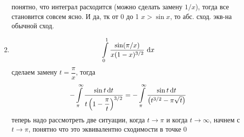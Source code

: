 \documentclass{report}
\begin{document}
\begin{enumerate}
\[    \]
    понятно, что интеграл расходится (можно сделать замену $1/x$), тогда все становится совсем ясно. И да, тк от 0 до 1 $x > \sin x$, то абс. сход. экв-на обычной сход.\\
\item 
    \[
    \int\limits_0^1 \dfrac{\sin(\pi/x)}{x(1-x)^{3/2}}\,\dl x
    \]
    сделаем замену $t = \dfrac{\pi}{x}$, тогда
    \[
        -\int\limits_{\pi}^{\infty} \dfrac{\sin t\dl t}{t\left(1-\dfrac{\pi}{t}\right)^{3/2}} = -\int\limits_{\pi}^{\infty} \dfrac{\sin t \dl t}{\left(t^{3/2}-\pi\sqrt{t}\right)}
    \]
    теперь надо рассмотреть две ситуации, когда $t \to \pi$ и когда $t \to \infty$, начнем с $t \to \pi$, понятно что это эквивалентно сходимости в точке 0
    \end{enumerate}
\end{document}

